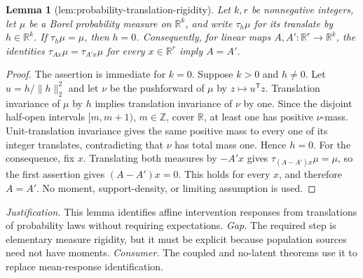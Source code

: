 \documentclass{article}
\newtheorem{lemma}{Lemma}
\begin{document}
\begin{lemma}[lem:probability-translation-rigidity]\label{lem:probability-translation-rigidity}
Let \(k,r\) be nonnegative integers, let \(\mu\) be a Borel probability measure on \(\mathbb R^k\), and write \(\tau_h\mu\) for its translate by \(h\in\mathbb R^k\). If \(\tau_h\mu=\mu\), then \(h=0\). Consequently, for linear maps \(A,A':\mathbb R^r\to\mathbb R^k\), the identities \(\tau_{Ax}\mu=\tau_{A'x}\mu\) for every \(x\in\mathbb R^r\) imply \(A=A'\).
\end{lemma}
\begin{proof}
The assertion is immediate for \(k=0\). Suppose \(k>0\) and \(h\ne0\). Let \(u=h/\lVert h\rVert_2^2\) and let \(\nu\) be the pushforward of \(\mu\) by \(z\mapsto u^{\mathsf T}z\). Translation invariance of \(\mu\) by \(h\) implies translation invariance of \(\nu\) by one. Since the disjoint half-open intervals \([m,m+1)\), \(m\in\mathbb Z\), cover \(\mathbb R\), at least one has positive \(\nu\)-mass. Unit-translation invariance gives the same positive mass to every one of its integer translates, contradicting that \(\nu\) has total mass one. Hence \(h=0\). For the consequence, fix \(x\). Translating both measures by \(-A'x\) gives \(\tau_{(A-A')x}\mu=\mu\), so the first assertion gives \((A-A')x=0\). This holds for every \(x\), and therefore \(A=A'\). No moment, support-density, or limiting assumption is used.
\end{proof}
\par\smallskip\noindent \textit{Justification.} This lemma identifies affine intervention responses from translations of probability laws without requiring expectations. \textit{Gap.} The required step is elementary measure rigidity, but it must be explicit because population sources need not have moments. \textit{Consumer.} The coupled and no-latent theorems use it to replace mean-response identification.
\end{document}
